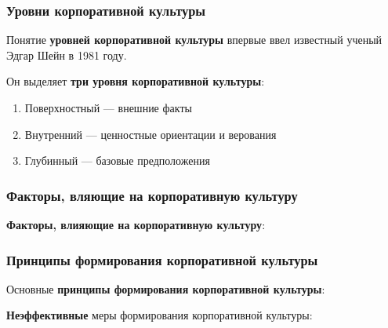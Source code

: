 \documentclass{article}
\begin{document}
\begin{multienumerate}
\end{multienumerate}

\subsubsection{Уровни корпоративной культуры}

Понятие \textbf{уровней корпоративной культуры} впервые ввел известный ученый Эдгар Шейн в 1981 году.

Он выделяет \textbf{три уровня корпоративной культуры}:

\begin{enumerate}
    \item Поверхностный — внешние факты
    \item Внутренний — ценностные ориентации и верования
    \item Глубинный — базовые предположения
\end{enumerate}

\subsubsection{Факторы, вляющие на корпоративную культуру}

\textbf{Факторы, влияющие на корпоративную культуру}:

\begin{multienumerate}
\end{multienumerate}

\subsubsection{Принципы формирования корпоративной культуры}

Основные \textbf{принципы формирования корпоративной культуры}:

\begin{multienumerate}
\end{multienumerate}

\textbf{Неэффективные} меры формирования корпоративной культуры:
\end{document}
